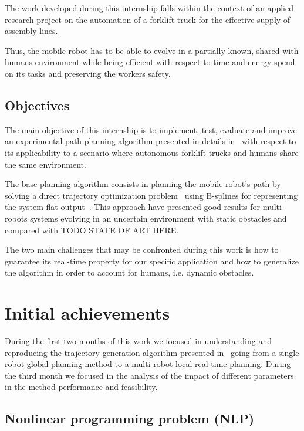 The work developed during this internship falls within the context of an applied research project on the automation of a forklift truck for the effective supply of assembly lines.

Thus, the mobile robot has to be able to evolve in a partially known, shared with humans environment while being efficient with respect to time and energy spend on its tasks and preserving the workers safety.

\subsection{Objectives}

The main objective of this internship is to implement, test, evaluate and improve an experimental path planning algorithm presented in details in~\cite{Defoort2007a} with respect to its applicability to a scenario where autonomous forklift trucks and humans share the same environment.

The base planning algorithm consists in planning the mobile robot's path by solving a direct trajectory optimization problem~\cite{betts1998survey} using B-splines for representing the system flat output~\cite{milam2003real}. This approach have presented good results for multi-robots systems evolving in an uncertain environment with static obstacles and compared with TODO STATE OF ART HERE.

The two main challenges that may be confronted during this work is how to guarantee its real-time property for our specific application and how to generalize the algorithm in order to account for humans, i.e. dynamic obstacles.

\section{Initial achievements}
\label{sec:etatdelart}


During the first two months of this work we focused in understanding and reproducing the trajectory generation algorithm presented in~\cite{Defoort2007a} going from a single robot global planning method to a multi-robot local real-time planning. During the third month we focused in the analysis of the impact of different parameters in the method performance and feasibility.

\subsection{Nonlinear programming problem (NLP)}

